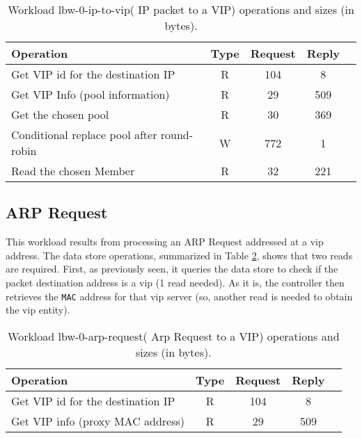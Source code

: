 \begin{table}[ht]
\small
\centering 
\begin{tabular}{l c c c c}
 Operation & Type & Request & Reply \\ \toprule 
Get VIP id for the destination IP & R & 104 & 8\\
Get VIP Info (pool information) & R & 29 & 509\\
Get the chosen pool & R & 30 & 369\\
Conditional replace pool after round-robin & W & 772 & 1\\
Read the chosen Member & R & 32 & 221 \\
\end{tabular}\caption[Workload lbw-0-ip-to-vip( IP packet to a VIP)
operations]{Workload lbw-0-ip-to-vip( IP packet to a VIP) operations
  and sizes (in bytes).}
\label{table:lbw-0-ip-to-vip}
\end{table}



\subsection{ARP Request}
This workload  results  from processing an ARP Request addressed at a
\gls{vip} address. The data store operations, summarized in Table
\ref{table:lbw-0-arp-request}, shows that two reads are
required. First, as previously seen,  it queries the data
store to check if the packet destination address is a \gls{vip} (1 read
needed). As it is, the controller then retrieves the \texttt{MAC} address for that
\gls{vip} server (so, another read is needed to obtain the \gls{vip} entity).

\begin{table}[ht]
\small
\centering 
\begin{tabular}{l c c c c}
Operation & Type & Request & Reply \\ \toprule 
Get VIP id for the destination IP  & R & 104 & 8\\
Get VIP info (proxy MAC address) & R & 29 & 509 \\\bottomrule
\end{tabular}\caption[Workload lbw-0-arp-request( Arp Request to a
VIP) operations]{Workload lbw-0-arp-request( Arp Request to a VIP)
 operations and sizes (in bytes).}
\label{table:lbw-0-arp-request}
\end{table}

